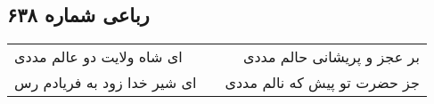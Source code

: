 \begin{center}
\section*{رباعی شماره ۶۳۸}
\label{sec:sh638}
\begin{longtable}{l p{0.5cm} r}
ای شاه ولایت دو عالم مددی
&&
بر عجز و پریشانی حالم مددی
\\
ای شیر خدا زود به فریادم رس
&&
جز حضرت تو پیش که نالم مددی
\\
\end{longtable}
\end{center}
